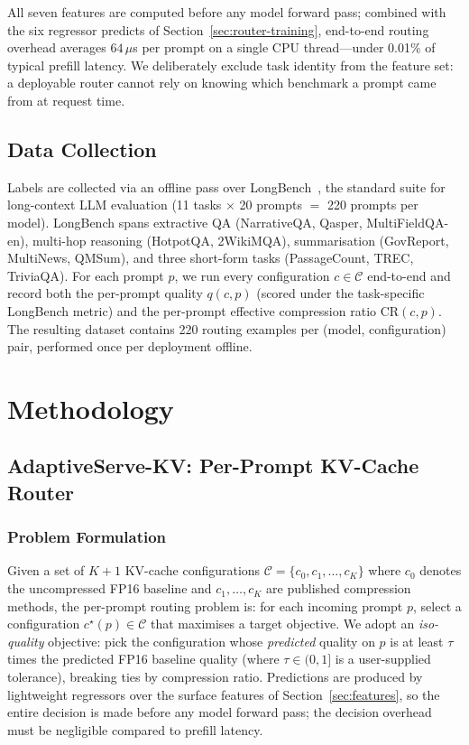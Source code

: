 \documentclass[10pt, conference]{IEEEtran}
\begin{document}
All seven features are computed before any model forward pass; combined with the six regressor predicts of Section~\ref{sec:router-training}, end-to-end routing overhead averages $64\,\mu$s per prompt on a single CPU thread---under 0.01\% of typical prefill latency. We deliberately exclude task identity from the feature set: a deployable router cannot rely on knowing which benchmark a prompt came from at request time.

\subsection{Data Collection}\label{sec:data-collection}
Labels are collected via an offline pass over LongBench~\cite{bai2023longbench}, the standard suite for long-context LLM evaluation (11 tasks $\times$ 20 prompts $=$ 220 prompts per model). LongBench spans extractive QA (NarrativeQA, Qasper, MultiFieldQA-en), multi-hop reasoning (HotpotQA, 2WikiMQA), summarisation (GovReport, MultiNews, QMSum), and three short-form tasks (PassageCount, TREC, TriviaQA). For each prompt $p$, we run every configuration $c \in \mathcal{C}$ end-to-end and record both the per-prompt quality $q(c, p)$ (scored under the task-specific LongBench metric) and the per-prompt effective compression ratio $\mathrm{CR}(c, p)$. The resulting dataset contains 220 routing examples per (model, configuration) pair, performed once per deployment offline.

\section{Methodology}

\subsection{AdaptiveServe-KV: Per-Prompt KV-Cache Router}

\subsubsection{Problem Formulation}
Given a set of $K{+}1$ KV-cache configurations $\mathcal{C} = \{c_0, c_1, \ldots, c_K\}$ where $c_0$ denotes the uncompressed FP16 baseline and $c_1, \ldots, c_K$ are published compression methods, the per-prompt routing problem is: for each incoming prompt $p$, select a configuration $c^\star(p) \in \mathcal{C}$ that maximises a target objective. We adopt an \emph{iso-quality} objective: pick the configuration whose \emph{predicted} quality on $p$ is at least $\tau$ times the predicted FP16 baseline quality (where $\tau \in (0, 1]$ is a user-supplied tolerance), breaking ties by compression ratio. Predictions are produced by lightweight regressors over the surface features of Section~\ref{sec:features}, so the entire decision is made before any model forward pass; the decision overhead must be negligible compared to prefill latency.
\end{document}
